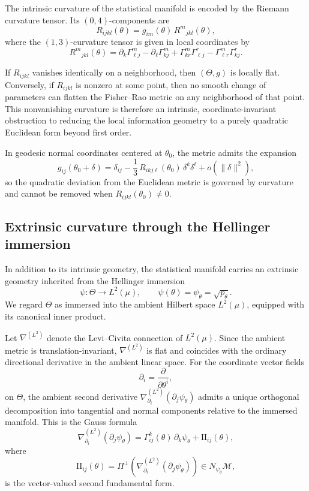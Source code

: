 \documentclass[11pt,letterpaper]{amsart}
\numberwithin{equation}{section}
\theoremstyle{plain}
\theoremstyle{definition}
\theoremstyle{remark}
\begin{document}
The intrinsic curvature of the statistical manifold is encoded by the Riemann curvature tensor. Its \((0,4)\)-components are
\begin{equation*}
R_{ijkl}(\theta)
=
g_{im}(\theta)\,R^{m}{}_{jkl}(\theta),
\end{equation*}
where the \((1,3)\)-curvature tensor is given in local coordinates by
\begin{equation*}
R^{m}{}_{jkl}(\theta)
=
\partial_k \Gamma^{m}_{\ell j}
-
\partial_\ell \Gamma^{m}_{k j}
+
\Gamma^{m}_{k r}\Gamma^{r}_{\ell j}
-
\Gamma^{m}_{\ell r}\Gamma^{r}_{k j}.
\end{equation*}

If \(R_{ijkl}\) vanishes identically on a neighborhood, then \((\Theta,g)\) is locally flat. Conversely, if \(R_{ijkl}\) is nonzero at some point, then no smooth change of parameters can flatten the Fisher--Rao metric on any neighborhood of that point. This nonvanishing curvature is therefore an intrinsic, coordinate-invariant obstruction to reducing the local information geometry to a purely quadratic Euclidean form beyond first order.

In geodesic normal coordinates centered at \(\theta_0\), the metric admits the expansion
\[
g_{ij}(\theta_0+\delta)
=
\delta_{ij}
-
\frac{1}{3}\,R_{ikj\ell}(\theta_0)\,\delta^k\delta^\ell
+
o(\|\delta\|^2),
\]
so the quadratic deviation from the Euclidean metric is governed by curvature and cannot be removed when \(R_{ijkl}(\theta_0)\neq 0\).

\subsection{Extrinsic curvature through the Hellinger immersion}

In addition to its intrinsic geometry, the statistical manifold carries an extrinsic geometry inherited from the Hellinger immersion
\[
\psi:\Theta\to L^2(\mu),
\qquad
\psi(\theta)=\psi_\theta=\sqrt{p_\theta}.
\]
We regard \(\Theta\) as immersed into the ambient Hilbert space \(L^2(\mu)\), equipped with its canonical inner product.

Let \(\nabla^{(L^2)}\) denote the Levi--Civita connection of \(L^2(\mu)\). Since the ambient metric is translation-invariant, \(\nabla^{(L^2)}\) is flat and coincides with the ordinary directional derivative in the ambient linear space. For the coordinate vector fields
\[
\partial_i=\frac{\partial}{\partial\theta^i},
\]
on \(\Theta\), the ambient second derivative \(\nabla^{(L^2)}_{\partial_i}(\partial_j\psi_\theta)\) admits a unique orthogonal decomposition into tangential and normal components relative to the immersed manifold. This is the Gauss formula
\begin{equation*}
\nabla^{(L^2)}_{\partial_i}(\partial_j\psi_\theta)
=
\Gamma^{k}_{ij}(\theta)\,\partial_k\psi_\theta
+
\mathrm{II}_{ij}(\theta),
\end{equation*}
where
\begin{equation*}
\mathrm{II}_{ij}(\theta)
=
\Pi^\perp\!\left(\nabla^{(L^2)}_{\partial_i}(\partial_j\psi_\theta)\right)
\in N_{\psi_\theta}\mathcal M,
\end{equation*}
is the vector-valued second fundamental form.
\end{document}
